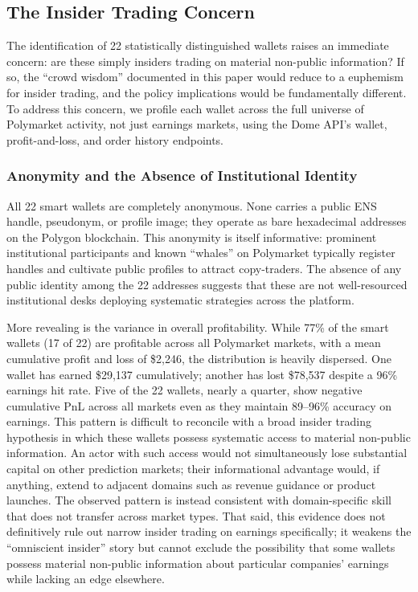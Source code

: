 \documentclass[11pt]{article}
\begin{document}
\subsection{The Insider Trading Concern}

The identification of 22 statistically distinguished wallets raises an immediate concern: are these simply insiders trading on material non-public information? If so, the ``crowd wisdom'' documented in this paper would reduce to a euphemism for insider trading, and the policy implications would be fundamentally different. To address this concern, we profile each wallet across the full universe of Polymarket activity, not just earnings markets, using the Dome API's wallet, profit-and-loss, and order history endpoints.

\subsubsection{Anonymity and the Absence of Institutional Identity}

All 22 smart wallets are completely anonymous. None carries a public ENS handle, pseudonym, or profile image; they operate as bare hexadecimal addresses on the Polygon blockchain. This anonymity is itself informative: prominent institutional participants and known ``whales'' on Polymarket typically register handles and cultivate public profiles to attract copy-traders. The absence of any public identity among the 22 addresses suggests that these are not well-resourced institutional desks deploying systematic strategies across the platform.

More revealing is the variance in overall profitability. While 77\% of the smart wallets (17 of 22) are profitable across all Polymarket markets, with a mean cumulative profit and loss of \$2,246, the distribution is heavily dispersed. One wallet has earned \$29,137 cumulatively; another has lost \$78,537 despite a 96\% earnings hit rate. Five of the 22 wallets, nearly a quarter, show negative cumulative PnL across all markets even as they maintain 89--96\% accuracy on earnings. This pattern is difficult to reconcile with a broad insider trading hypothesis in which these wallets possess systematic access to material non-public information. An actor with such access would not simultaneously lose substantial capital on other prediction markets; their informational advantage would, if anything, extend to adjacent domains such as revenue guidance or product launches. The observed pattern is instead consistent with domain-specific skill that does not transfer across market types. That said, this evidence does not definitively rule out narrow insider trading on earnings specifically; it weakens the ``omniscient insider'' story but cannot exclude the possibility that some wallets possess material non-public information about particular companies' earnings while lacking an edge elsewhere.
\end{document}
